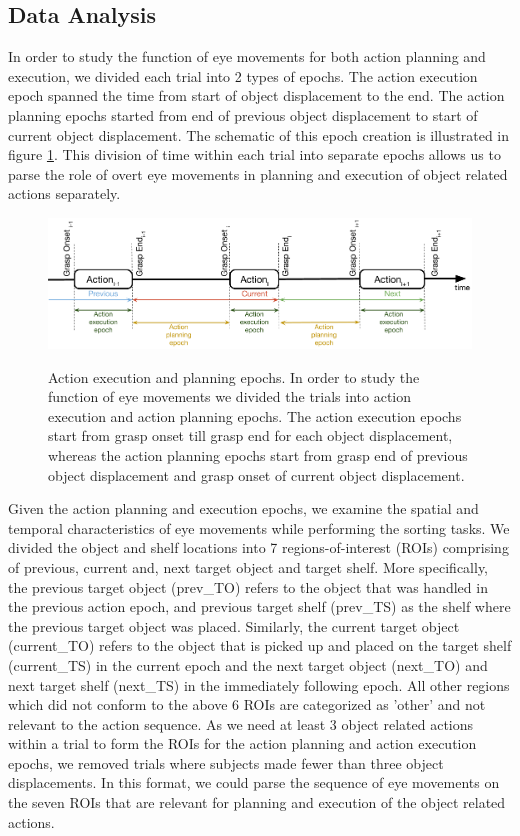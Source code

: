 \subsection{Data Analysis}\label{sec:data_analysis}
In order to study the function of eye movements for both action planning and execution, we divided each trial into 2 types of epochs. The action execution epoch spanned the time from start of object displacement to the end. The action planning epochs started from end of previous object displacement to start of current object displacement. The schematic of this epoch creation is illustrated in figure \ref{figure:epochs}. This division of time within each trial into separate epochs allows us to parse the role of overt eye movements in planning and execution of object related actions separately.

\begin{figure}[H]
    \centering
    \includegraphics[width=0.9\linewidth]{source/figures/experiment_setup/epoch_diagram.png} \\
    \caption[]{Action execution and planning epochs. In order to study the function of eye movements we divided the trials into action execution and action planning epochs. The action execution epochs start from grasp onset till grasp end for each object displacement, whereas the action planning epochs start from grasp end of previous object displacement and grasp onset of current object displacement. }
    \label{figure:epochs}
\end{figure}

Given the action planning and execution epochs, we examine the spatial and temporal characteristics of eye movements while performing the sorting tasks. We divided the object and shelf locations into 7 regions-of-interest (ROIs) comprising of previous, current and, next target object and target shelf. More specifically, the previous target object (prev\_TO) refers to the object that was handled in the previous action epoch, and previous target shelf (prev\_TS) as the shelf where the previous target object was placed. Similarly, the current target object (current\_TO) refers to the object that is picked up and placed on the target shelf (current\_TS) in the current epoch and the next target object (next\_TO) and next target shelf (next\_TS) in the immediately following epoch. All other regions which did not conform to the above 6 ROIs are categorized as 'other' and not relevant to the action sequence.  As we need at least 3 object related actions within a trial to form the ROIs for the action planning and action execution epochs, we removed trials where subjects made fewer than three object displacements. In this format, we could parse the sequence of eye movements on the seven ROIs that are relevant for planning and execution of the object related actions. 

